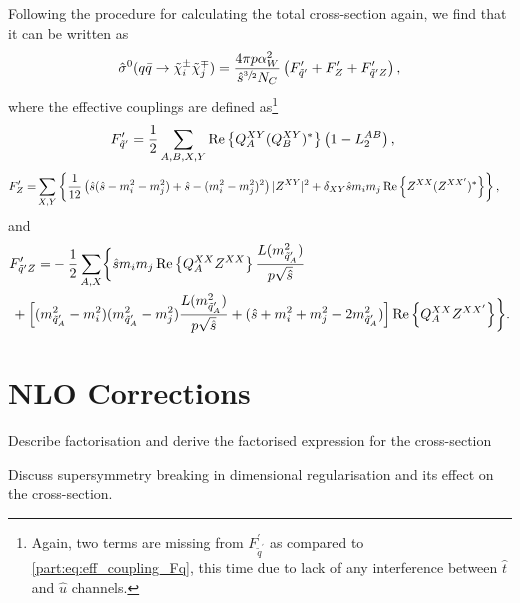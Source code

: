 \documentclass[../main.tex]{subfiles}
\begin{document}
Following the procedure for calculating the total cross-section again, we find that it can be written as
\begin{equation}
  \hat\sigma^0(q\bar{q} \to \tilde\chi^\pm_i \tilde\chi^\mp_j) = \frac{4 \pi p \alpha_W^2}{\hat{s}^{\sfrac{3}{2}} N_C} \left(F^\prime_{\tilde{q}^\prime} + F^\prime_Z + F^\prime_{\tilde{q}^\prime Z}\right),
\end{equation}
where the effective couplings are defined as\footnote{Again, two terms are missing from \(F^{\prime}_{\tilde{q}^\prime}\) as compared to \cref{part:eq:eff_coupling_Fq}, this time due to lack of any interference between \(\hat{t}\) and \(\hat{u}\) channels.}
\begin{align}
  \label{part:eq:CC_eff_coupling_Fq}
  F^{\prime}_{\tilde{q}^\prime} = \frac{1}{2} \sum_{A,B,X,Y} & \operatorname{Re}\left\{Q_A^{XY} (Q_B^{XY})^\ast\right\} \left(1 - L_2^{AB}\right),
\end{align}
\begin{align}
  \label{part:eq:CC_eff_coupling_FZ}
  F^{\prime}_{Z} = & \sum_{X,Y} \left\{\frac{1}{12} \left(\hat{s}(\hat{s}-m_i^2-m_j^2) + \hat{s} - (m_i^2-m_j^2)^2\right) |Z^{XY}|^2 + \delta_{XY} \hat{s}m_i m_j \operatorname{Re}\left\{Z^{XX} (Z^{XX^\prime})^\ast\right\}\right\},
\end{align}
and
\begin{align}
  \label{part:eq:CC_eff_coupling_FqZ}
  \nonumber
  F^\prime_{\tilde{q}^\prime Z} = & -\frac{1}{2} \sum_{A,X} \biggl\{
  \hat{s} m_i m_j \Re{Q_{A}^{XX} Z^{XX}}\frac{L(m_{\tilde{q}^\prime_A}^2)}{p \sqrt{\hat{s}}}                                                                                                                                                                               \\
                                  & \hspace{-1cm}+ \Bigl[(m_{\tilde{q}^\prime_A}^2-m_i^2)(m_{\tilde{q}^\prime_A}^2-m_j^2) \frac{L(m_{\tilde{q}^\prime_A}^2)}{p \sqrt{\hat{s}}} + (\hat{s} + m_i^2 + m_j^2 - 2m_{\tilde{q}^\prime_A}^2)\Bigr] \Re{Q_{A}^{XX} Z^{XX^\prime}}
  \biggr\}.
\end{align}



\section{NLO Corrections}
\begin{TODO}
  \item Describe factorisation and derive the factorised expression for
  the cross-section
  \item Discuss supersymmetry breaking in dimensional regularisation and
  its effect on
  the cross-section.
\end{TODO}
\end{document}
